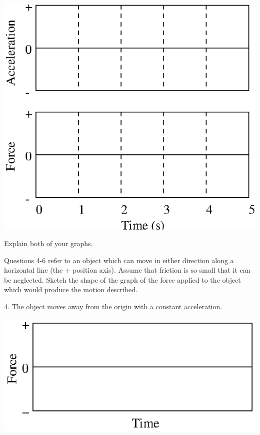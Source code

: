 \vspace{0.3cm}
{\par\centering \includegraphics{force1/force1_fig9.eps} \par}
\vspace{0.3cm}

Explain both of your graphs.
\answerspace{20mm}

Questions 4-6 refer to an object which can move in either direction along a
horizontal line (the + position axis). Assume that friction is so small that
it can be neglected. Sketch the shape of the graph of the force applied to the
object which would produce the motion described. 

4. The object moves away from the origin with a constant acceleration.

\vspace{0.3cm}
{\par\centering \includegraphics[scale=1.1]{force1/force1_fig10.eps} \par}
\vspace{0.3cm}

